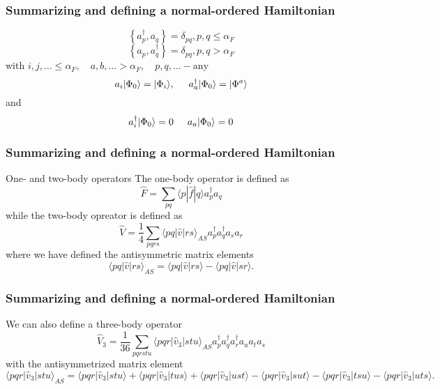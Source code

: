 \documentclass{beamer}
\begin{document}
\begin{frame}
\frametitle{Summarizing and defining a normal-ordered Hamiltonian}

\begin{block}{}
\[
\left\{a_p^\dagger, a_q \right\}= \delta_{pq}, p, q \leq \alpha_F 
\]
\[
\left\{a_p, a_q^\dagger \right\} = \delta_{pq}, p, q > \alpha_F
\]
with         $i,j,\ldots \leq \alpha_F, \quad a,b,\ldots > \alpha_F, \quad p,q, \ldots - \textrm{any}$
\[
        a_i|\Phi_0\rangle = |\Phi_i\rangle, \hspace{0.5cm} a_a^\dagger|\Phi_0\rangle = |\Phi^a\rangle
\]
and         
\[
a_i^\dagger|\Phi_0\rangle = 0 \hspace{0.5cm}  a_a|\Phi_0\rangle = 0
\]
\end{block}
\end{frame}

\begin{frame}
\frametitle{Summarizing and defining a normal-ordered Hamiltonian}

\begin{block}{One- and two-body operators }
The one-body operator is defined as
\[
 \hat{F} = \sum_{pq} \langle p|\hat{f}|q\rangle a_p^\dagger a_q
\]
while the two-body opreator is defined as
\[
\hat{V} = \frac{1}{4} \sum_{pqrs} \langle pq|\hat{v}|rs\rangle_{AS} a_p^\dagger a_q^\dagger a_s a_r
\]
where we have defined the antisymmetric matrix elements
\[
\langle pq|\hat{v}|rs\rangle_{AS} = \langle pq|\hat{v}|rs\rangle - \langle pq|\hat{v}|sr\rangle.
\]
\end{block}
\end{frame}

\begin{frame}
\frametitle{Summarizing and defining a normal-ordered Hamiltonian}

\begin{block}{}
We can also define a three-body operator
\[
\hat{V}_3 = \frac{1}{36} \sum_{pqrstu} \langle pqr|\hat{v}_3|stu\rangle_{AS} 
                a_p^\dagger a_q^\dagger a_r^\dagger a_u a_t a_s
\]
with the antisymmetrized matrix element
\[
            \langle pqr|\hat{v}_3|stu\rangle_{AS} = \langle pqr|\hat{v}_3|stu\rangle + \langle pqr|\hat{v}_3|tus\rangle + \langle pqr|\hat{v}_3|ust\rangle- \langle pqr|\hat{v}_3|sut\rangle - \langle pqr|\hat{v}_3|tsu\rangle - \langle pqr|\hat{v}_3|uts\rangle.
\]
\end{block}
\end{frame}
\end{document}
